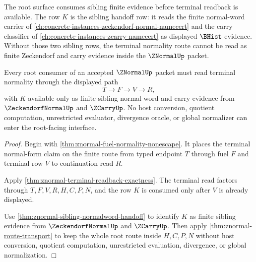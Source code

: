 The root surface consumes sibling finite evidence before terminal readback is available. The row $K$ is the sibling handoff row: it reads the finite normal-word carrier of \autoref{ch:concrete-instances-zeckendorf-normal-namecert} and the carry classifier of \autoref{ch:concrete-instances-zcarry-namecert} as displayed $\BHist$ evidence. Without those two sibling rows, the terminal normality route cannot be read as finite Zeckendorf and carry evidence inside the $\ZNormalUp$ packet.

\begin{theorem}
\label{thm:znormal-root-terminal-nonescape-interface}
Every root consumer of an accepted $\ZNormalUp$ packet must read terminal normality through the displayed path
$$
T \to F \to V \to R,
$$
with $K$ available only as finite sibling normal-word and carry evidence from $\ZeckendorfNormalUp$ and $\ZCarryUp$. No host conversion, quotient computation, unrestricted evaluator, divergence oracle, or global normalizer can enter the root-facing interface.
\end{theorem}
\begin{proof}
Begin with \autoref{thm:znormal-fuel-normality-nonescape}. It places the terminal normal-form claim on the finite route from typed endpoint $T$ through fuel $F$ and terminal row $V$ to continuation read $R$.

Apply \autoref{thm:znormal-terminal-readback-exactness}. The terminal read factors through $T,F,V,R,H,C,P,N$, and the row $K$ is consumed only after $V$ is already displayed.

Use \autoref{thm:znormal-sibling-normalword-handoff} to identify $K$ as finite sibling evidence from $\ZeckendorfNormalUp$ and $\ZCarryUp$. Then apply \autoref{thm:znormal-route-transport} to keep the whole root route inside $H,C,P,N$ without host conversion, quotient computation, unrestricted evaluation, divergence, or global normalization.
\end{proof}

